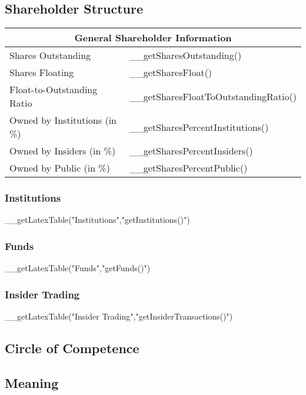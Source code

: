 \subsection{Shareholder Structure}

\begin{tabularx}{\textwidth}{|X|X|}
    \hline
    \multicolumn{2}{|c|}{General Shareholder Information} \\
    \hline
    Shares Outstanding            & __getSharesOutstanding() \\
    Shares Floating               & __getSharesFloat() \\
    Float-to-Outstanding Ratio    & __getSharesFloatToOutstandingRatio() \\
    Owned by Institutions (in \%) & __getSharesPercentInstitutions() \\
    Owned by Insiders (in \%)     & __getSharesPercentInsiders() \\
    Owned by Public (in \%)       & __getSharesPercentPublic() \\
    \hline
\end{tabularx}

\subsubsection{Institutions}

__getLatexTable("Institutions","getInstitutions()")

\subsubsection{Funds}

__getLatexTable("Funds","getFunds()")

\subsubsection{Insider Trading}

__getLatexTable("Insider Trading","getInsiderTransactions()")

\subsection{Circle of Competence}

\subsection{Meaning}

